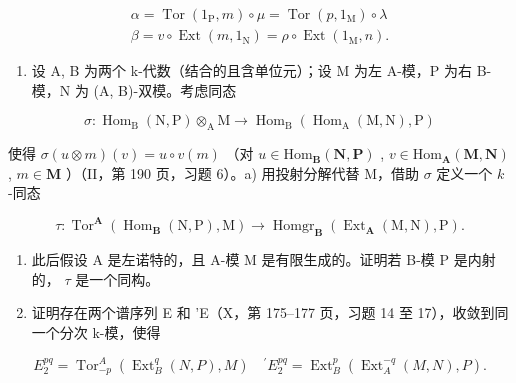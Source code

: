 \[
\begin{array}{l} \alpha = \operatorname{Tor} (1 _ {\mathrm{P}}, m) \circ \mu = \operatorname{Tor} (p, 1 _ {\mathrm{M}}) \circ \lambda \\ \beta = v \circ \operatorname{Ext} (m, 1 _ {\mathrm{N}}) = \rho \circ \operatorname{Ext} (1 _ {\mathrm{M}}, n). \end{array}
\]

\begin{enumerate}
\def\labelenumi{\arabic{enumi})}
\setcounter{enumi}{1}
\tightlist
\item
  设 A, B 为两个 k-代数（结合的且含单位元）；设 M 为左 A-模，P 为右 B-模，N 为 (A, B)-双模。考虑同态
\end{enumerate}

\[
\sigma : \operatorname{Hom} _ {\mathrm{B}} (\mathrm{N}, \mathrm{P}) \otimes_ {\mathrm{A}} \mathrm{M} \rightarrow \operatorname{Hom} _ {\mathrm{B}} (\operatorname{Hom} _ {\mathrm{A}} (\mathrm{M}, \mathrm{N}), \mathrm{P})
\]

使得 \(\sigma(u \otimes m)(v) = u \circ v(m)\) （对 \(u \in \mathrm{Hom}_{\mathbf{B}}(\mathbf{N}, \mathbf{P})\) , \(v \in \mathrm{Hom}_{\mathbf{A}}(\mathbf{M}, \mathbf{N})\) , \(m \in \mathbf{M}\) ）（II，第 190 页，习题 6）。a) 用投射分解代替 M，借助 \(\sigma\) 定义一个 \(k\) -同态

\[
\tau : \operatorname{Tor} ^ {\mathbf {A}} \left(\operatorname{Hom} _ {\mathbf {B}} (\mathrm{N}, \mathrm{P}), \mathrm{M}\right)\rightarrow \operatorname{Homgr} _ {\mathbf {B}} \left(\operatorname{Ext} _ {\mathbf {A}} (\mathrm{M}, \mathrm{N}), \mathrm{P}\right).
\]

\begin{enumerate}
\def\labelenumi{\alph{enumi})}
\setcounter{enumi}{1}
\item
  此后假设 A 是左诺特的，且 A-模 M 是有限生成的。证明若 B-模 P 是内射的， \(\tau\) 是一个同构。
\item
  证明存在两个谱序列 E 和 'E（X，第 175–177 页，习题 14 至 17），收敛到同一个分次 k-模，使得
\end{enumerate}

\[
E _ {2} ^ {p q} = \operatorname{Tor} _ {- p} ^ {A} \left(\operatorname{Ext} _ {B} ^ {q} (N, P), M\right) \quad^ {\prime} E _ {2} ^ {p q} = \operatorname{Ext} _ {B} ^ {p} \left(\operatorname{Ext} _ {A} ^ {- q} (M, N), P\right).
\]

